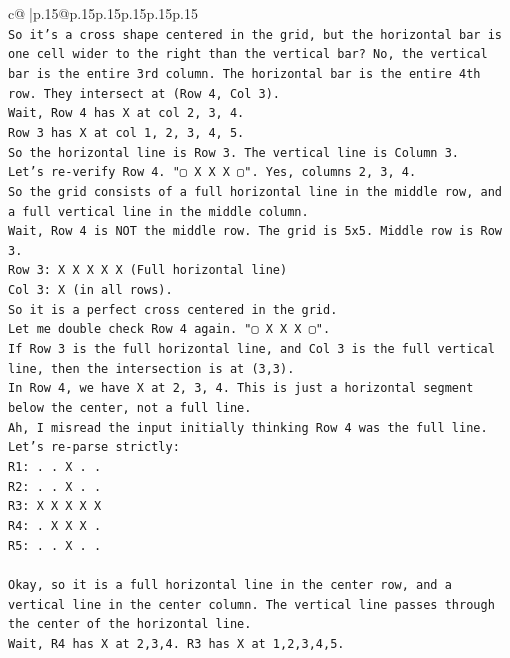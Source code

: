 \documentclass{article}
\begin{document}
{\begin{supertabular}{c@{$\;$}|p{.15\linewidth}@{}p{.15\linewidth}p{.15\linewidth}p{.15\linewidth}p{.15\linewidth}p{.15\linewidth}}
{{{\\ 
\texttt{So it's a cross shape centered in the grid, but the horizontal bar is one cell wider to the right than the vertical bar? No, the vertical bar is the entire 3rd column. The horizontal bar is the entire 4th row. They intersect at (Row 4, Col 3).} \\
\texttt{Wait, Row 4 has X at col 2, 3, 4.} \\
\texttt{Row 3 has X at col 1, 2, 3, 4, 5.} \\
\texttt{So the horizontal line is Row 3. The vertical line is Column 3.} \\
\texttt{Let's re{-}verify Row 4. "▢ X X X ▢". Yes, columns 2, 3, 4.} \\
\texttt{So the grid consists of a full horizontal line in the middle row, and a full vertical line in the middle column.} \\
\texttt{Wait, Row 4 is NOT the middle row. The grid is 5x5. Middle row is Row 3.} \\
\texttt{Row 3: X X X X X (Full horizontal line)} \\
\texttt{Col 3: X (in all rows).} \\
\texttt{So it is a perfect cross centered in the grid.} \\
\texttt{Let me double check Row 4 again. "▢ X X X ▢".} \\
\texttt{If Row 3 is the full horizontal line, and Col 3 is the full vertical line, then the intersection is at (3,3).} \\
\texttt{In Row 4, we have X at 2, 3, 4. This is just a horizontal segment below the center, not a full line.} \\
\texttt{Ah, I misread the input initially thinking Row 4 was the full line.} \\
\texttt{Let's re{-}parse strictly:} \\
\texttt{R1: . . X . .} \\
\texttt{R2: . . X . .} \\
\texttt{R3: X X X X X} \\
\texttt{R4: . X X X .} \\
\texttt{R5: . . X . .} \\
\\ 
\texttt{Okay, so it is a full horizontal line in the center row, and a vertical line in the center column. The vertical line passes through the center of the horizontal line.} \\
\texttt{Wait, R4 has X at 2,3,4. R3 has X at 1,2,3,4,5.} \\
}}}
\end{supertabular}}
\end{document}
